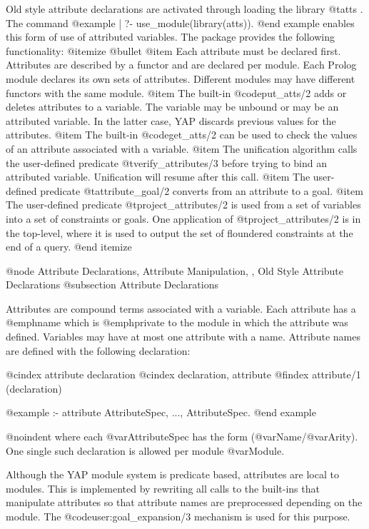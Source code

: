 Old style attribute declarations are activated through loading the library @t{atts} . The command
@example
| ?- use_module(library(atts)).
@end example
enables this form of use of attributed variables. The package provides the
following functionality:
@itemize @bullet
@item Each attribute must be declared first. Attributes are described by a functor
and are declared per module. Each Prolog module declares its own sets of
attributes. Different modules may have different functors with the same
module.
@item The built-in @code{put_atts/2} adds or deletes attributes to a
variable. The variable may be unbound or may be an attributed
variable. In the latter case, YAP discards previous values for the
attributes.
@item The built-in @code{get_atts/2} can be used to check the values of
an attribute associated with a variable.
@item The unification algorithm calls the user-defined predicate
@t{verify_attributes/3} before trying to bind an attributed
variable. Unification will resume after this call.
@item The user-defined predicate
@t{attribute_goal/2} converts from an attribute to a goal.
@item The user-defined predicate
@t{project_attributes/2} is used from a set of variables into a set of
constraints or goals. One application of @t{project_attributes/2} is in
the top-level, where it is used to output the set of
floundered constraints at the end of a query.
@end itemize

@node Attribute Declarations, Attribute Manipulation, , Old Style Attribute Declarations
@subsection Attribute Declarations

Attributes are compound terms associated with a variable. Each attribute
has a @emph{name} which is @emph{private} to the module in which the
attribute was defined. Variables may have at most one attribute with a
name. Attribute names are defined with the following declaration:

@cindex attribute declaration
@cindex declaration, attribute
@findex attribute/1 (declaration)

@example
:- attribute AttributeSpec, ..., AttributeSpec.
@end example

@noindent
where each @var{AttributeSpec} has the form (@var{Name}/@var{Arity}).
One single such declaration is allowed per module @var{Module}.

Although the YAP module system is predicate based, attributes are local
to modules. This is implemented by rewriting all calls to the
built-ins that manipulate attributes so that attribute names are
preprocessed depending on the module.  The @code{user:goal_expansion/3}
mechanism is used for this purpose.



